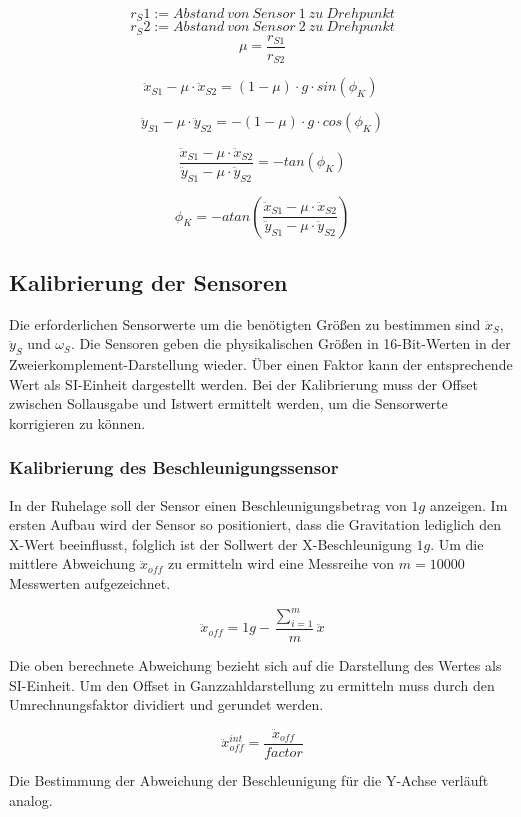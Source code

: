 \documentclass{article}
\begin{document}
\[\ r_S1 := Abstand \ von \ Sensor \ 1 \ zu \ Drehpunkt \]
\[\ r_S2 := Abstand \ von \ Sensor \ 2 \ zu \ Drehpunkt \]
\[\ \mu = \frac{r_{S1}}{r_{S2}} \]

\[ \ddot{x}_{S1} - \mu \cdot \ddot{x}_{S2} = (1 - \mu) \cdot g \cdot sin(\phi_K) \]

\[\ \ddot{y}_{S1} - \mu \cdot \ddot{y}_{S2} = - (1 - \mu) \cdot g \cdot cos(\phi_K) \]

\[\ \frac{\ddot{x}_{S1} - \mu \cdot \ddot{x}_{S2}}{\ddot{y}_{S1} - \mu \cdot \ddot{y}_{S2}} = 
-tan(\phi_K) \]

\[\ \phi_K = - atan(\frac{\ddot{x}_{S1} - \mu \cdot \ddot{x}_{S2}}{\ddot{y}_{S1} - \mu \cdot \ddot{y}_{S2}}) \]


\subsection{Kalibrierung der Sensoren}
Die erforderlichen Sensorwerte um die benötigten Größen zu bestimmen sind $\ddot{x}_S$, $\ddot{y}_S$ und $\omega_S$. Die Sensoren geben die physikalischen Größen in 16-Bit-Werten in der Zweierkomplement-Darstellung wieder. Über einen Faktor kann der entsprechende Wert als SI-Einheit dargestellt werden. Bei der Kalibrierung muss der Offset zwischen Sollausgabe und Istwert ermittelt werden, um die Sensorwerte korrigieren zu können.

\subsubsection{Kalibrierung des Beschleunigungssensor}
In der Ruhelage soll der Sensor einen Beschleunigungsbetrag von $1g$ anzeigen. Im ersten Aufbau wird der Sensor so positioniert, dass die Gravitation lediglich den X-Wert beeinflusst, folglich ist der Sollwert der X-Beschleunigung $1g$. Um die mittlere Abweichung $\ddot{x}_{off}$ zu ermitteln wird eine Messreihe von $m = 10000$ Messwerten aufgezeichnet. 

\[\ \ddot{x}_{off} = 1g - \frac{\sum_{i = 1}^{m}}{m} \ddot{x} \]

Die oben berechnete Abweichung bezieht sich auf die Darstellung des Wertes als SI-Einheit. Um den Offset in Ganzzahldarstellung zu ermitteln muss durch den Umrechnungsfaktor dividiert und gerundet werden.

\[\ \ddot{x}_{off}^{int} = \frac{\ddot{x}_{off}}{factor} \]

Die Bestimmung der Abweichung der Beschleunigung für die Y-Achse verläuft analog.
\end{document}
